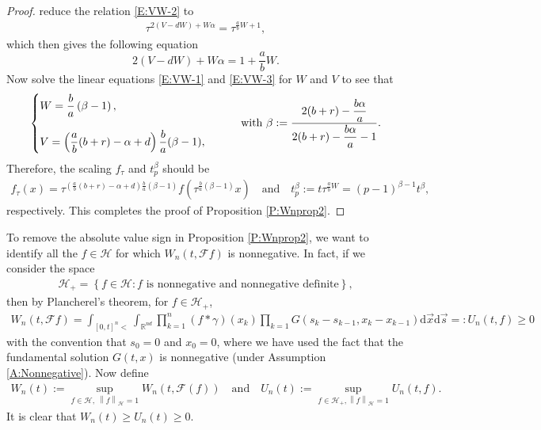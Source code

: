 \documentclass[a4paper,11pt]{article}
\numberwithin{equation}{section}
\numberwithin{equation}{section}
\theoremstyle{plain}
\theoremstyle{definition}
\newcommand{\ud}{\ensuremath{\mathrm{d} }}
\newcommand{\Norm}[1]{\left\|  #1   \right\|}
\newcommand{\R}{\mathbb{R}}
\begin{document}
\begin{proof}
  reduce the relation \eqref{E:VW-2} to
  \begin{align*}
    \tau^{2(V-dW)+W\alpha} = \tau^{\frac{a}{b}W+1},
  \end{align*}
  which then gives the following equation
  \begin{equation} \label{E:VW-3}
    2(V-dW)+W\alpha= 1 + \frac{a}{b}W .
  \end{equation}
  Now solve the linear equations \eqref{E:VW-1} and \eqref{E:VW-3} for $W$ and $V$ to see that
  \begin{align*}
    \begin{cases}
      W = \displaystyle \dfrac{b}{a}\left( \beta -1 \right), \bigskip \\
      V = \displaystyle \left(\frac{a}{b}(b+r)-\alpha +d\right)\frac{b}{a}(\beta -1),
    \end{cases}
    \qquad
    \text{with }\beta := \dfrac{2(b+r)-\dfrac{b\alpha}{a}}{ 2(b+r)-\dfrac{b\alpha}{a} -1 }.
  \end{align*}
  Therefore, the scaling $f_\tau$ and $t_p^\beta$ should be
  \begin{align*}
    f_\tau(x) = \tau^{\left(\frac{a}{b}(b+r)-\alpha+d\right)\frac{b}{a}(\beta -1)} f\left(\tau^{\frac{b}{a}(\beta -1)}x\right)
    \quad \text{and} \quad
    t_p^\beta := t\tau^{\frac{a}{b}W} = (p-1)^{\beta -1} t^\beta,
  \end{align*}
  respectively. This completes the proof of Proposition \ref{P:Wnprop2}.
\end{proof}

To remove the absolute value sign in Proposition \ref{P:Wnprop2}, we want to identify all the $f \in
\mathcal H$ for which $W_n(t,\mathcal{F}f)$ is nonnegative. In fact, if we consider the space
\begin{align*}
  \mathcal{H}_+ = \left\{ f\in \mathcal{H} : \text{$f$ is nonnegative and nonnegative definite}\right\},
\end{align*}
then by Plancherel's theorem, for $f\in\mathcal{H}_+$,
\begin{align*}
    W_n(t,\mathcal{F}f) = \int_{[0,t]^n<} \int_{\R^{nd}} \prod_{k=1}^n(f*\gamma)(x_k) \prod_{k=1}
    G(s_k - s_{k-1}, x_k-x_{k-1}) \ud \vec{x} \ud \vec{s} =: U_n(t,f) \ge 0
\end{align*}
with the convention that $s_0=0$ and $x_0=0$, where we have used the fact that the fundamental
solution $G(t,x)$ is nonnegative (under Assumption \ref{A:Nonnegative}).  Now define
\begin{align*}
  W_n(t) := \sup_{f\in\mathcal{H},\: \Norm{f}_{\mathcal{H}}=1} W_n(t,\mathcal{F}(f)) \quad \text{and} \quad
  U_n(t) :=  \sup_{f\in\mathcal{H}_+, \Norm{f}_{\mathcal{H}}=1} U_n(t,f).
\end{align*}
It is clear that $W_n(t) \ge U_n(t) \ge 0$.
\end{document}
